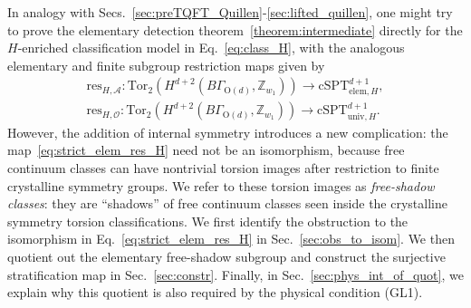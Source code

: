 \documentclass[aps,prx,reprint,superscriptaddress,twocolumn,amsmath,amssymb,amsfonts, nofootinbib]{revtex4-2}
\newcommand{\res}{\text{res}}
\newcommand{\tor}{\text{Tor}}
\theoremstyle{apsstyle}
\begin{document}
{In analogy with Secs.~\ref{sec:preTQFT_Quillen}-\ref{sec:lifted_quillen}, one might try to prove the elementary detection theorem~\ref{theorem:intermediate} directly for the $H$-enriched classification model in Eq.~\ref{eq:class_H}, with the analogous elementary and finite subgroup restriction maps given by
\begin{gather}
\label{eq:strict_elem_res_H}
\res_{H,\mathcal A}: \tor_2\left(H^{d+2}(B\Gamma_{\mathrm{O}(d)},\mathbb Z_{w_1})\right) \longrightarrow \mathrm{cSPT}^{d+1}_{\mathrm{elem},H},\\
\res_{H,\mathcal O}: \tor_2\left(H^{d+2}(B\Gamma_{\mathrm{O}(d)},\mathbb Z_{w_1})\right) \longrightarrow \mathrm{cSPT}^{d+1}_{\mathrm{univ},H}.
\label{eq:strict_fin_res_H}
\end{gather}
However, the addition of internal symmetry introduces a new complication: the map~\eqref{eq:strict_elem_res_H} need not be an isomorphism, because free continuum classes can have nontrivial torsion images after restriction to finite crystalline symmetry groups. We refer to these torsion images as \emph{free-shadow classes}: they are ``shadows'' of free continuum classes seen inside the crystalline symmetry torsion classifications. 
We first identify the obstruction to the isomorphism in Eq.~\eqref{eq:strict_elem_res_H} in Sec.~\ref{sec:obs_to_isom}. We then quotient out the elementary free-shadow subgroup and construct the surjective stratification map in Sec.~\ref{sec:constr}. Finally, in Sec.~\ref{sec:phys_int_of_quot}, we explain why this quotient is also required by the physical condition {\rm(GL1)}. 

}
\end{document}
